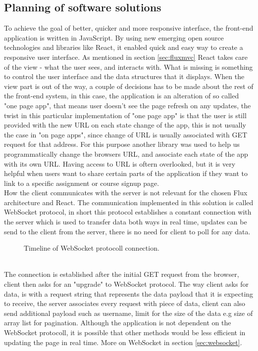 \subsection{Planning of software solutions}\label{sec:softwaresolution}
To achieve the goal of better, quicker and more responsive interface, the front-end application is written in JavaScript. By using new emerging open source technologies and libraries like React, it enabled quick and easy way to create a responsive user interface. As mentioned in section \ref{sec:fluxmvc} React takes care of the view - what the user sees, and interacts with. What is missing is something to control the user interface and the data structures that it displays. When the view part is out of the way, a couple of decisions has to be made about the rest of the front-end system, in this case, the application is an alteration of so called "one page app", that means user doesn't see the page refresh on any updates, the twist in this particular implementation of "one page app" is that the user is still provided with the new URL on each state change of the app, this is not usually the case in "on page apps", since change of URL is usually associated with GET request for that address. For this purpose another library was used to help us programmatically change the browsers URL, and associate each state of the app with its own URL. Having access to URL is oftern overlooked, but it is very helpful when users want to share certain parts of the application if they want to link to a specific assignment or course signup page.
\\How the client communicates with the server is not relevant for the chosen Flux architecture and React. The communication implemented in this solution is called WebSocket protocol, in short this protocol establishes a constant connection with the server which is used to transfer data both ways in real time, updates can be send to the client from the server, there is no need for client to poll for any data.
\begin{figure}[h]
\centering

\caption{Timeline of WebSocket protocoll connection.}
\label{fig:wstimeline}
\end{figure}
\\The connection is established after the initial GET request from the browser, client then asks for an "upgrade" to WebSocket protocol. The way client asks for data, is with a request string that represents the data payload that it is expecting to receive, the server associates every request with piece of data, client can also send additional payload such as username, limit for the size of the data e.g size of array list for pagination. Although the application is not dependent on the WebSocket protocoll, it is possible that other methods would be less efficient in updating the page in real time. More on WebSocket in section \ref{sec:websocket}.
